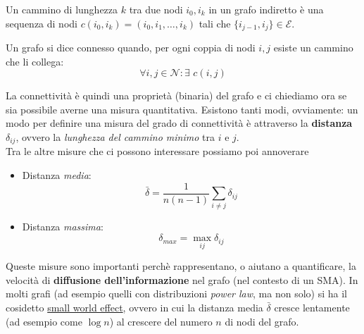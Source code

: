  Un cammino di lunghezza $k$ tra due nodi $i_0, i_k$ in un grafo indiretto \`e una sequenza di nodi $c(i_0,i_k) = (i_0, i_1, \dots, i_k)$ tali che $\{i_{j-1}, i_j\} \in \mathcal{E}$. 

 Un grafo si dice connesso quando, per ogni coppia di nodi $i,j$ esiste un cammino che li collega:
\begin{equation}
    \forall i,j \in \mathcal{N}: \exists \hspace{4pt} c(i,j)
\end{equation}

La connettivit\`a \`e quindi una propriet\`a (binaria) del grafo e ci chiediamo ora se sia possibile averne una misura quantitativa.
Esistono tanti modi, ovviamente: un modo per definire una misura del grado di connettivit\`a \`e attraverso la \textbf{distanza} $\delta_{ij}$, ovvero la \textit{lunghezza del cammino minimo} tra $i$ e $j$.\\
Tra le altre misure che ci possono interessare possiamo poi annoverare
\begin{itemize}
    \item Distanza \textit{media}: 
    \begin{equation}
        \bar{\delta} = \frac{1}{n(n-1)} \sum_{i \neq j} \delta_{ij}
    \end{equation}
    \item Distanza \textit{massima}: 
    \begin{equation}
        \delta_{max} = \max_{ij} \delta_{ij}
    \end{equation}
\end{itemize}
Queste misure sono importanti perch\`e rappresentano, o aiutano a quantificare, la velocit\`a di \textbf{diffusione dell'informazione} nel grafo (nel contesto di un SMA). 
In molti grafi (ad esempio quelli con distribuzioni \textit{power law}, ma non solo) si ha il cosidetto \href{https://en.wikipedia.org/wiki/Small-world_network}{small world effect}, ovvero in cui la distanza media $\bar{\delta}$ cresce lentamente (ad esempio come $\log n$) al crescere del numero $n$ di nodi del grafo.


